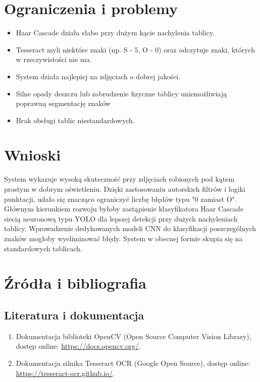 \documentclass[12pt,a4paper]{article}
\begin{document}
\section{Ograniczenia i problemy}

\begin{itemize}
    \item Haar Cascade działa słabo przy dużym kącie nachylenia tablicy.
    \item Tesseract myli niektóre znaki (np. S - 5, O - 0) oraz odczytuje znaki, których w rzeczywistości nie ma.
    \item System działa najlepiej na zdjęciach o dobrej jakości.
    \item Silne opady deszczu lub zabrudzenie fizyczne tablicy uniemożliwiają poprawną segmentację znaków
    \item Brak obsługi tablic niestandardowych.
\end{itemize}

\section{Wnioski}

System wykazuje wysoką skuteczność przy zdjęciach robionych pod kątem prostym w dobrym oświetleniu. Dzięki zastosowaniu autorskich filtrów i logiki punktacji, udało się znacząco ograniczyć liczbę błędów typu "0 zamiast O". Głównym kierunkiem rozwoju byłoby zastąpienie klasyfikatora Haar Cascade siecią neuronową typu YOLO dla lepszej detekcji przy dużych nachyleniach tablicy. Wprowadzenie dedykowanych modeli CNN do klasyfikacji poszczególnych znaków mogłoby wyeliminować błędy. System w obecnej formie skupia się na standardowych tablicach.


\section{Źródła i bibliografia}

\subsection{Literatura i dokumentacja}
\begin{enumerate}
    \item Dokumentacja biblioteki OpenCV (Open Source Computer Vision Library), dostęp online: \url{https://docs.opencv.org/}.
    \item Dokumentacja silnika Tesseract OCR (Google Open Source), dostęp online: \url{https://tesseract-ocr.github.io/}.
\end{enumerate}
\end{document}
